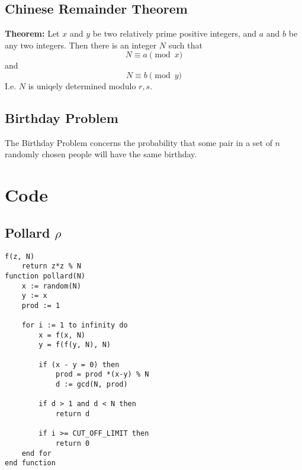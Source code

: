 \documentclass[a4paper, 12pt]{report}
\begin{document}
\section{Chinese Remainder Theorem}
\label{sec:chinese}

\begin{description}
\item{\bf Theorem:} Let $x$ and $y$ be two relatively prime positive integers, and $a$ and $b$ be any two integers. Then there is an integer $N$ such that 
\begin{equation}
N \equiv a \pmod x 
\end{equation}
and
\begin{equation}
N \equiv b \pmod y
\end{equation}
I.e. $N$ is uniqely determined modulo $r,s$.

\end{description}

\section{Birthday Problem}
\label{sec:birthday}
The Birthday Problem concerns the probability that some pair in a set of $n$ randomly chosen people will have the same birthday.

\chapter{Code}
\section{Pollard $\rho$}
\begin{lstlisting}[frame=single] 
f(z, N)
	return z*z % N
function pollard(N) 
	x := random(N) 
	y := x 	
	prod := 1

	for i := 1 to infinity do
		x = f(x, N)
		y = f(f(y, N), N)

		if (x - y = 0) then
			prod = prod *(x-y) % N
			d := gcd(N, prod)

		if d > 1 and d < N then
			return d

		if i >= CUT_OFF_LIMIT then
			return 0
	end for
end function
\end{lstlisting}
\end{document}
